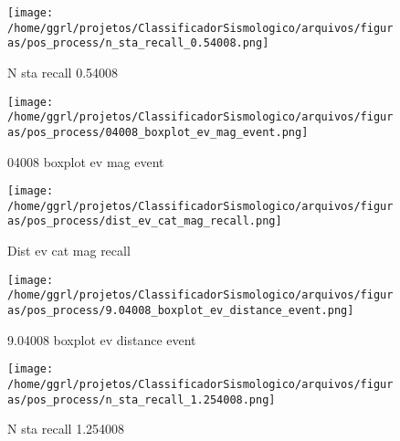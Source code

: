                     \begin{figure}[H]
                        \centering
                        \texttt{[image: /home/ggrl/projetos/ClassificadorSismologico/arquivos/figuras/pos\_process/n\_sta\_recall\_0.54008.png]}
                        \caption{N sta recall 0.54008}
                        \label{fig:n_sta_recall_0.54008}
                    \end{figure}
                

                    \begin{figure}[H]
                        \centering
                        \texttt{[image: /home/ggrl/projetos/ClassificadorSismologico/arquivos/figuras/pos\_process/04008\_boxplot\_ev\_mag\_event.png]}
                        \caption{04008 boxplot ev mag event}
                        \label{fig:04008_boxplot_ev_mag_event}
                    \end{figure}
                

                    \begin{figure}[H]
                        \centering
                        \texttt{[image: /home/ggrl/projetos/ClassificadorSismologico/arquivos/figuras/pos\_process/dist\_ev\_cat\_mag\_recall.png]}
                        \caption{Dist ev cat mag recall}
                        \label{fig:dist_ev_cat_mag_recall}
                    \end{figure}
                

                    \begin{figure}[H]
                        \centering
                        \texttt{[image: /home/ggrl/projetos/ClassificadorSismologico/arquivos/figuras/pos\_process/9.04008\_boxplot\_ev\_distance\_event.png]}
                        \caption{9.04008 boxplot ev distance event}
                        \label{fig:9.04008_boxplot_ev_distance_event}
                    \end{figure}
                

                    \begin{figure}[H]
                        \centering
                        \texttt{[image: /home/ggrl/projetos/ClassificadorSismologico/arquivos/figuras/pos\_process/n\_sta\_recall\_1.254008.png]}
                        \caption{N sta recall 1.254008}
                        \label{fig:n_sta_recall_1.254008}
                    \end{figure}
                

